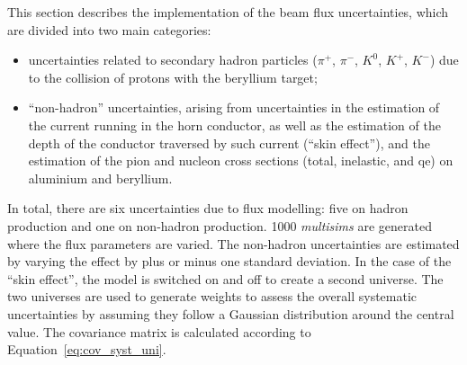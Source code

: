 This section describes the implementation of the beam flux uncertainties, which are divided into two main categories: 
\begin{itemize}
\item uncertainties related to secondary hadron particles ($\pi^+$, $\pi^-$, $K^0$, $K^+$, $K^-$) due to the collision of protons with the beryllium target;
\item ``non-hadron'' uncertainties, arising from uncertainties in the estimation of the current running in the horn conductor, as well as the estimation of the depth of the conductor traversed by such current (``skin effect''), and the estimation of  the pion and nucleon cross sections (total, inelastic, and \acrshort{qe}) on aluminium and beryllium.
\end{itemize} 
In total, there are six uncertainties due to flux modelling: five on hadron production and one on non-hadron production. 
1000 \emph{multisims} are generated where the flux parameters are varied. The non-hadron uncertainties are estimated by varying the effect by plus or minus one standard deviation. In the case of the ``skin effect'', the model is switched on and off to create a second universe. The two universes are used to generate weights to assess the overall systematic uncertainties by assuming they follow a Gaussian distribution around the central value. The covariance matrix is calculated according to Equation~\eqref{eq:cov_syst_uni}.

